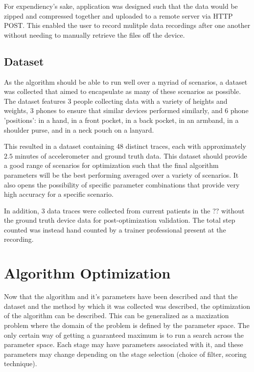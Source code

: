             For expendiency's sake, application was designed such that the data would be zipped and compressed together and uploaded to a remote server via HTTP POST. This enabled the user to record mulitple data recordings after one another without needing to manually retrieve the files off the device.


        \section{Dataset}

            As the algorithm should be able to run well over a myriad of scenarios, a dataset was collected that aimed to encapsulate as many of these scenarios as possible. The dataset features 3 people collecting data with a variety of heights and weights, 3 phones to ensure that similar devices performed similarly, and 6 phone 'positions': in a hand, in a front pocket, in a back pocket, in an armband, in a shoulder purse, and in a neck pouch on a lanyard. 

            This resulted in a dataset containing 48 distinct traces, each with approximately $2.5$ minutes of accelerometer and ground truth data. This dataset should provide a good range of scenarios for optimization such that the final algorithm parameters will be the best performing averaged over a variety of scenarios. It also opens the possibility of specific parameter combinations that provide very high accuracy for a specific scenario. 

            In addition, 3 data traces were collected from current patients in the ?? without the ground truth device data for post-optimization validation. The total step counted was instead hand counted by a trainer professional present at the recording.

    \chapter{Algorithm Optimization}

        Now that the algorithm and it's parameters have been described and that the dataset and the method by which it was collected was described, the optimization of the algorithm can be described. This can be generalized as a maxization problem where the domain of the problem is defined by the parameter space. The only certain way of getting a guaranteed maximum is to run a search across the parameter space. Each stage may have parameters associated with it, and these parameters may change depending on the stage selection (choice of filter, scoring technique). 

